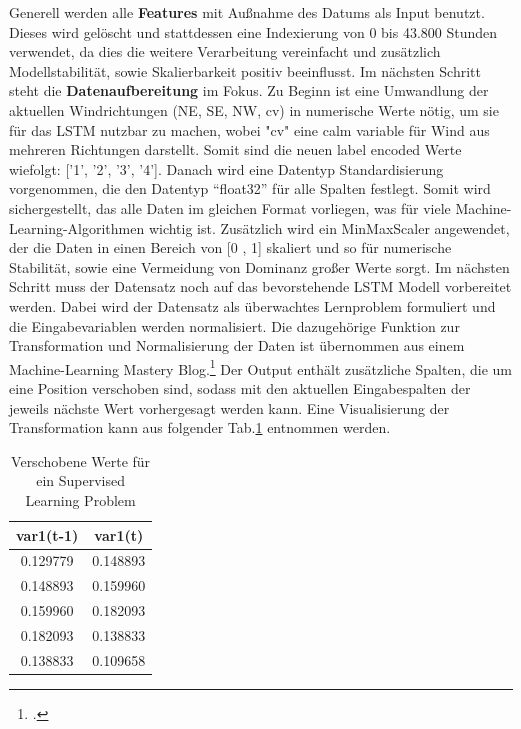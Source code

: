 \documentclass{article}
\begin{document}
Generell werden alle \textbf{Features} mit Außnahme des Datums als Input benutzt. Dieses wird gelöscht und stattdessen eine Indexierung von 0 bis 43.800 Stunden verwendet, da dies die weitere Verarbeitung 
vereinfacht und zusätzlich Modellstabilität, sowie Skalierbarkeit positiv beeinflusst. 
Im nächsten Schritt steht die \textbf{Datenaufbereitung} im Fokus.
Zu Beginn ist eine Umwandlung der aktuellen Windrichtungen (NE, SE, NW, cv) in numerische Werte nötig, um sie für das LSTM nutzbar zu machen, wobei "cv" eine calm variable für Wind aus mehreren Richtungen darstellt.
Somit sind die neuen label encoded Werte wiefolgt: ['1', '2', '3', '4']. 
Danach wird eine Datentyp Standardisierung vorgenommen, die den Datentyp ``float32'' für alle Spalten festlegt. 
Somit wird sichergestellt, das alle Daten im gleichen Format vorliegen, was für viele Machine-Learning-Algorithmen wichtig ist.
Zusätzlich wird ein MinMaxScaler angewendet, der die Daten in einen Bereich von [0 , 1] skaliert und so für numerische Stabilität, sowie eine Vermeidung von Dominanz großer Werte sorgt. 
Im nächsten Schritt muss der Datensatz noch auf das bevorstehende LSTM Modell vorbereitet werden. 
Dabei wird der Datensatz als überwachtes Lernproblem formuliert und die Eingabevariablen werden normalisiert. 
Die dazugehörige Funktion zur Transformation und Normalisierung der Daten ist übernommen aus einem Machine-Learning Mastery Blog.\footcite[vgl.][1]{brownleeMultivariateTimeSeries2017}
Der Output enthält zusätzliche Spalten, die um eine Position verschoben sind, sodass mit den aktuellen Eingabespalten der jeweils nächste Wert vorhergesagt werden kann.
Eine Visualisierung der Transformation kann aus folgender Tab.\ref{tab:supervised_learning} entnommen werden.
\begin{table}[H]
  \centering
  \begin{tabular}{|c|c|}
  \hline
  \textbf{var1(t-1)} & \textbf{var1(t)} \\ \hline
  \rowcolor{cyan} 0.129779 & \cellcolor{yellow} 0.148893 \\ \hline
  \rowcolor{yellow} 0.148893 & \cellcolor{orange} 0.159960 \\ \hline
  \rowcolor{orange} 0.159960 & \cellcolor{green} 0.182093 \\ \hline
  \rowcolor{green} 0.182093 & \cellcolor{red} 0.138833 \\ \hline
  \rowcolor{red} 0.138833 & \cellcolor{pink} 0.109658 \\ \hline
  \end{tabular}
  \caption{Verschobene Werte für ein Supervised Learning Problem}
  \label{tab:supervised_learning}
\end{table}
\end{document}
